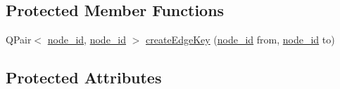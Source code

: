 \subsection*{Protected Member Functions}
\begin{DoxyCompactItemize}
\item 
Q\+Pair$<$ \hyperlink{_complex_network_8hpp_a8323334ca788fde39682469321590d52}{node\+\_\+id}, \hyperlink{_complex_network_8hpp_a8323334ca788fde39682469321590d52}{node\+\_\+id} $>$ \hyperlink{class_complex_network_a982b0db93143ff949025e326794af02d}{create\+Edge\+Key} (\hyperlink{_complex_network_8hpp_a8323334ca788fde39682469321590d52}{node\+\_\+id} from, \hyperlink{_complex_network_8hpp_a8323334ca788fde39682469321590d52}{node\+\_\+id} to)
\end{DoxyCompactItemize}
\subsection*{Protected Attributes}
